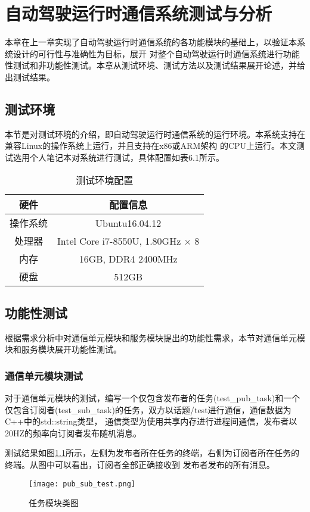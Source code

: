 \chapter{自动驾驶运行时通信系统测试与分析}
本章在上一章实现了自动驾驶运行时通信系统的各功能模块的基础上，以验证本系统设计的可行性与准确性为目标，展开
对整个自动驾驶运行时通信系统进行功能性测试和非功能性测试。本章从测试环境、测试方法以及测试结果展开论述，并给出测试结果。

\section{测试环境}
本节是对测试环境的介绍，即自动驾驶运行时通信系统的运行环境。本系统支持在兼容Linux的操作系统上运行，并且支持在x86或ARM架构
的CPU上运行。本文测试选用个人笔记本对系统进行测试，具体配置如表6.1所示。
\begin{table}[htb]
  \centering\small
  \caption{测试环境配置}
  \label{tab:exampletable}
  \begin{tabular}{cc}
    \toprule
    硬件 & 配置信息 \\
    \midrule
    操作系统 & Ubuntu16.04.12\\
    处理器 & Intel Core i7-8550U, 1.80GHz $\times$ 8\\
    内存 & 16GB, DDR4 2400MHz\\
    硬盘 & 512GB\\
    \bottomrule
  \end{tabular}
\end{table}
    
\section{功能性测试}
根据需求分析中对通信单元模块和服务模块提出的功能性需求，本节对通信单元模块和服务模块展开功能性测试。
\subsection{通信单元模块测试}
对于通信单元模块的测试，编写一个仅包含发布者的任务(test\_pub\_task)和一个仅包含订阅者(test\_sub\_task)的任务，双方以话题/test进行通信，通信数据为C++中的std::string类型，
通信类型为使用共享内存进行进程间通信，发布者以20HZ的频率向订阅者发布随机消息。


测试结果如图\ref{pub_sub_test}所示，左侧为发布者所在任务的终端，右侧为订阅者所在任务的终端。从图中可以看出，订阅者全部正确接收到
发布者发布的所有消息。

\begin{figure}[H]
  \centering
  \texttt{[image: pub\_sub\_test.png]}
  \caption{任务模块类图}
  \label{pub_sub_test}
\end{figure}

